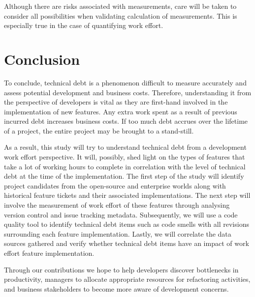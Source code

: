 Although there are risks associated with measurements, care will be taken to
consider all possibilities when validating calculation of measurements. This is
especially true in the case of quantifying work effort.

\section{Conclusion}
\label{conclusion}

To conclude, technical debt is a phenomenon difficult to measure accurately and
assess potential development and business costs. Therefore, understanding it
from the perspective of developers is vital as they are first-hand involved in
the implementation of new features. Any extra work spent as a result of previous
incurred debt increases business costs. If too much debt accrues over the
lifetime of a project, the entire project may be brought to a stand-still.

As a result, this study will try to understand technical debt from a development
work effort perspective. It will, possibly, shed light on the types of features
that take a lot of working hours to complete in correlation with the level of
technical debt at the time of the implementation. The first step of the study
will identify project candidates from the open-source and enterprise worlds
along with historical feature tickets and their associated implementations. The
next step will involve the measurement of work effort of these features through
analysing version control and issue tracking metadata. Subsequently, we will use
a code quality tool to identify technical debt items such as code smells with
all revisions surrounding each feature implementation. Lastly, we will correlate
the data sources gathered and verify whether technical debt items have an impact
of work effort feature implementation.

Through our contributions we hope to help developers discover bottlenecks in
productivity, managers to allocate appropriate resources for refactoring
activities, and business stakeholders to become more aware of development
concerns.




